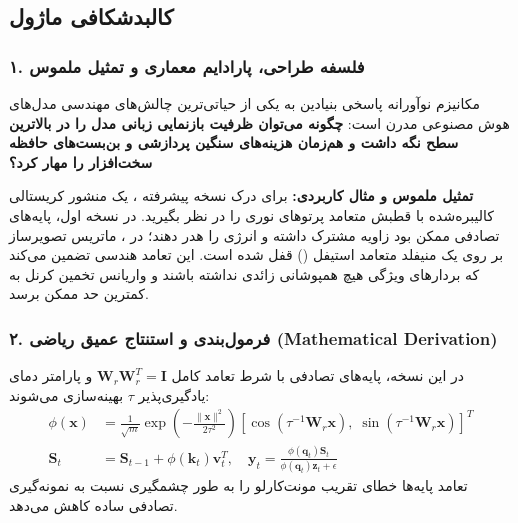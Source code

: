 \subsection{کالبدشکافی ماژول }

\subsubsection*{۱. فلسفه طراحی، پارادایم معماری و تمثیل ملموس}
مکانیزم نوآورانه  پاسخی بنیادین به یکی از حیاتی‌ترین چالش‌های مهندسی مدل‌های هوش مصنوعی مدرن است: \textbf{چگونه می‌توان ظرفیت بازنمایی زبانی مدل را در بالاترین سطح نگه داشت و هم‌زمان هزینه‌های سنگین پردازشی و بن‌بست‌های حافظه سخت‌افزار را مهار کرد؟}

\textbf{تمثیل ملموس و مثال کاربردی:}
برای درک نسخه پیشرفته ، یک منشور کریستالی کالیبره‌شده با قطبش متعامد پرتوهای نوری را در نظر بگیرید. در نسخه اول، پایه‌های تصادفی ممکن بود زاویه مشترک داشته و انرژی را هدر دهند؛ در ، ماتریس تصویرساز بر روی یک منیفلد متعامد استیفل () قفل شده است. این تعامد هندسی تضمین می‌کند که بردارهای ویژگی هیچ همپوشانی زائدی نداشته باشند و واریانس تخمین کرنل به کمترین حد ممکن برسد.

\subsubsection*{۲. فرمول‌بندی و استنتاج عمیق ریاضی (Mathematical Derivation)}
در این نسخه، پایه‌های تصادفی با شرط تعامد کامل $\mathbf{W}_r \mathbf{W}_r^T = \mathbf{I}$ و پارامتر دمای یادگیری‌پذیر $\tau$ بهینه‌سازی می‌شوند:
\begin{align}
\phi(\mathbf{x}) &= \frac{1}{\sqrt{m}} \exp\left(-\frac{\|\mathbf{x}\|^2}{2\tau^2}\right) \left[ \cos(\tau^{-1} \mathbf{W}_r \mathbf{x}), \; \sin(\tau^{-1} \mathbf{W}_r \mathbf{x}) \right]^T \\
\mathbf{S}_t &= \mathbf{S}_{t-1} + \phi(\mathbf{k}_t) \mathbf{v}_t^T, \quad \mathbf{y}_t = \frac{\phi(\mathbf{q}_t) \mathbf{S}_t}{\phi(\mathbf{q}_t) \mathbf{z}_t + \epsilon}
\end{align}
تعامد پایه‌ها خطای تقریب مونت‌کارلو را به طور چشمگیری نسبت به نمونه‌گیری تصادفی ساده کاهش می‌دهد.

